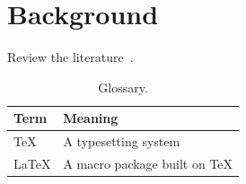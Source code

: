 \chapter{Background}\label{ch:background}
Review the literature~\cite{knuth1984,lamport1994}.

\begin{table}[h]
  \centering
  \begin{tabular}{ll}
    \toprule
    Term & Meaning \\
    \midrule
    TeX & A typesetting system \\
    LaTeX & A macro package built on TeX \\
    \bottomrule
  \end{tabular}
  \caption{Glossary.}
\end{table}
